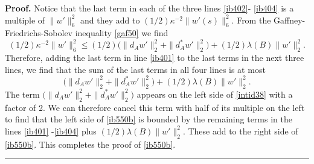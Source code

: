 \documentclass[12pt]{article}
\newenvironment{proof}[1][Proof]{\textbf{#1.} }{\ \rule{0.5em}{0.5em}}
\def \beq{\begin{equation}}
\def \eeq{\end{equation}}
\def \eref{\eqref}
\numberwithin{equation}{section}
\begin{document}
\begin{proof}
         Notice that the last term in each of the three lines \eref{ib402}- \eref{ib404} is a multiple
  of $\|w'\|_6^2$ and  they add to $(1/2) \kappa^{-2} \|w'(s)\|_6^2$.
   From the Gaffney-Friedrichs-Sobolev inequality  \eref{gaf50} we find  
$$
(1/2)\kappa^{-2} \|w'\|_6^2 \le (1/2)\Big( \|d_A w'\|_2^2 +  \|d_A^*w'\|_2^2\Big) 
        +(1/2)\lambda(B) \|w'\|_2^2.
$$
Therefore, adding the last term in line \eref{ib401}  to the last terms in the next three lines,
 we find  that the sum of the last terms  in all four lines is at most
\beq
\Big( \|d_A w'\|_2^2 +  \|d_A^*w'\|_2^2\Big) 
        +(1/2)\lambda(B) \|w'\|_2^2.
\eeq
The term  $\Big( \|d_A w'\|_2^2 +  \|d_A^*w'\|_2^2\Big)$ appears on the left side of
\eref{intid38} with a factor of 2. We can therefore cancel this term with half of its multiple
on the left to find that the left side of \eref{ib550b} is bounded by the remaining terms
in the lines \eref{ib401} -\eref{ib404} plus  $(1/2)\lambda(B) \|w'\|_2^2$.
These add to the right side of \eref{ib550b}. 
        This completes the proof of \eref{ib550b}.
 \end{proof} 
 \bigskip
 
\end{document}
